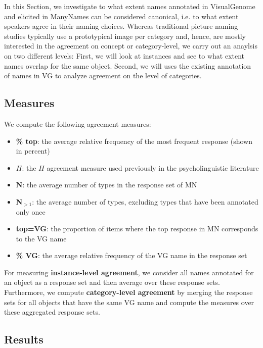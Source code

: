 
In this Section, we investigate to what extent names annotated in VisualGenome and elicited in ManyNames can be considered canonical, i.e. to what extent speakers agree in their naming choices.
Whereas traditional picture naming studies typically use a prototypical image per category and, hence, are mostly interested in the agreement on concept or category-level, we carry out an anaylsis on two different levels: First, we will look at instances and see to what extent names overlap for the same object. Second, we will uses the existing annotation of names in VG to analyze agreement on the level of categories.


\subsection{Measures}

We compute the following agreement measures:

\begin{itemize}
\item \textbf{\% top}: the average relative frequency of the most frequent response (shown in percent)
\item \textbf{$H$}: the $H$ agreement measure used previously in the psycholinguistic literature
\item \textbf{N}: the average number of types in the response set of MN
\item \textbf{N$_{>1}$}: the average number of types, excluding types that have been annotated only once
\item \textbf{top=VG}: the proportion of items where the top response in MN corresponds to the VG name
\item \textbf{\% VG}: the average relative frequency of the VG name in the response set

\end{itemize}

For measuring \textbf{instance-level agreement}, we consider all names annotated for an object as a response set and then average over these response sets. Furthermore, we compute \textbf{category-level agreement} by merging the response sets for all objects that have the same VG name and compute the measures over these aggregated response sets.




\subsection{Results}

